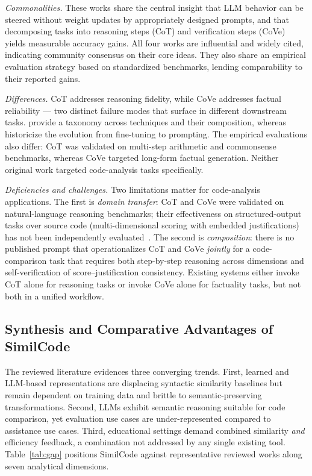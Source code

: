 \documentclass[twocolumn,11pt]{article}
\begin{document}
    \textit{Commonalities.} These works share the central insight that LLM behavior can be steered without weight updates by appropriately designed prompts, and that decomposing tasks into reasoning steps (CoT) and verification steps (CoVe) yields measurable accuracy gains. All four works are influential and widely cited, indicating community consensus on their core ideas. They also share an empirical evaluation strategy based on standardized benchmarks, lending comparability to their reported gains.
     
    \textit{Differences.} CoT \citep{wei2022chain} addresses reasoning fidelity, while CoVe \citep{dhuliawala2024chain} addresses factual reliability --- two distinct failure modes that surface in different downstream tasks. \citet{sahoo2024systematic} provide a taxonomy across techniques and their composition, whereas \citet{liu2023pretrain} historicize the evolution from fine-tuning to prompting. The empirical evaluations also differ: CoT was validated on multi-step arithmetic and commonsense benchmarks, whereas CoVe targeted long-form factual generation. Neither original work targeted code-analysis tasks specifically.
     
    \textit{Deficiencies and challenges.} Two limitations matter for code-analysis applications. The first is \emph{domain transfer}: CoT and CoVe were validated on natural-language reasoning benchmarks; their effectiveness on structured-output tasks over source code (multi-dimensional scoring with embedded justifications) has not been independently evaluated~\citep{sahoo2024systematic}. The second is \emph{composition}: there is no published prompt that operationalizes CoT and CoVe \emph{jointly} for a code-comparison task that requires both step-by-step reasoning across dimensions and self-verification of score--justification consistency. Existing systems either invoke CoT alone for reasoning tasks or invoke CoVe alone for factuality tasks, but not both in a unified workflow.
    \subsection{Synthesis and Comparative Advantages of SimilCode}\label{sec:synth}
    The reviewed literature evidences three converging trends. First, learned and LLM-based representations are displacing syntactic similarity baselines but remain dependent on training data and brittle to semantic-preserving transformations. Second, LLMs exhibit semantic reasoning suitable for code comparison, yet evaluation use cases are under-represented compared to assistance use cases. Third, educational settings demand combined similarity \emph{and} efficiency feedback, a combination not addressed by any single existing tool. Table~\ref{tab:gap} positions SimilCode against representative reviewed works along seven analytical dimensions.
     
\end{document}
